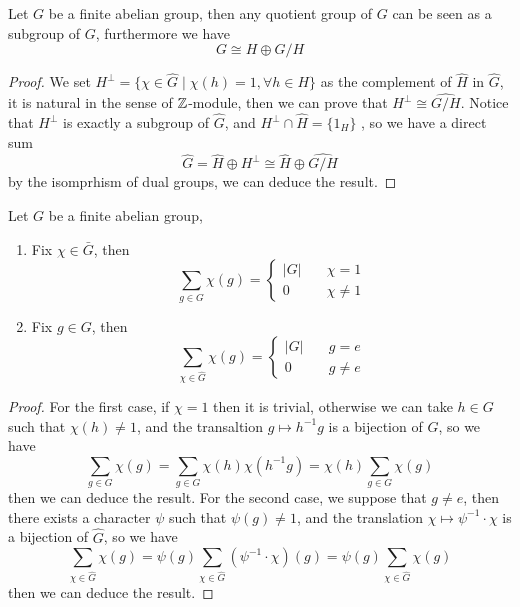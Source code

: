 \begin{theorem}
    Let \(G\) be a finite abelian group, then any quotient group of \(G\) can be seen as a subgroup of \(G\), furthermore we have
    \[G \cong H \oplus G/H\]
\end{theorem}

\begin{proof}
    We set \(H^\perp = \{\chi \in \hat{G} \mid \chi(h) = 1, \forall h \in H\}\) as the complement of \(\hat{H}\) in \(\hat{G}\), it is natural in the sense of \(\mathbb{Z}\)-module, then we can prove that \(H^{\perp} \cong\widehat{G/H}\). Notice that \(H^{\perp}\) is exactly a subgroup of \(\hat{G}\), and \(H^\perp \cap \hat{H} = \{1_H\}\) , so we have a direct sum \[\hat{G} = \hat{H} \oplus H^\perp \cong \hat{H} \oplus \widehat{G/H}\]
    by the isomprhism of dual groups, we can deduce the result. 
\end{proof}

\begin{proposition}[orthogonality]
    Let \(G\) be a finite abelian group,
    \begin{enumerate}
        \item Fix \(\chi \in \bar{G}\), then \[\sum_{g \in G} \chi(g) = \begin{cases}
            |G|  \quad &\chi = 1 \\
            0 \quad &\chi \neq 1
        \end{cases}\]
        \item Fix \(g \in G\), then \[\sum_{\chi \in \hat{G}} \chi(g) = \begin{cases}
            |G|  \quad &g = e \\
            0 \quad &g \neq e
        \end{cases}\]
    \end{enumerate}
    
\end{proposition}

\begin{proof}
    For the first case, if \(\chi = 1\) then it is trivial, otherwise we can take \(h \in G\) such that \(\chi(h) \neq 1\), and the transaltion \(g \mapsto h^{-1}g\) is a bijection of \(G\), so we have
    \[\sum_{g\in G}\chi(g) = \sum_{g \in G}\chi(h)\chi(h^{-1}g) = \chi(h) \sum_{g \in G}\chi(g)\]
    then we can deduce the result. For the second case, we suppose that \(g \neq e\), then there exists a character \(\psi\) such that \(\psi(g) \neq 1\), and the translation \(\chi \mapsto \psi^{-1}\cdot \chi\) is a bijection of \(\hat{G}\), so we have
    \[\sum_{\chi \in \hat{G}} \chi(g) = \psi(g) \sum_{\chi \in \hat{G}} (\psi^{-1}\cdot 
    \chi)(g) = \psi(g) \sum_{\chi \in \hat{G}} \chi(g)\]
    then we can deduce the result.
\end{proof}

